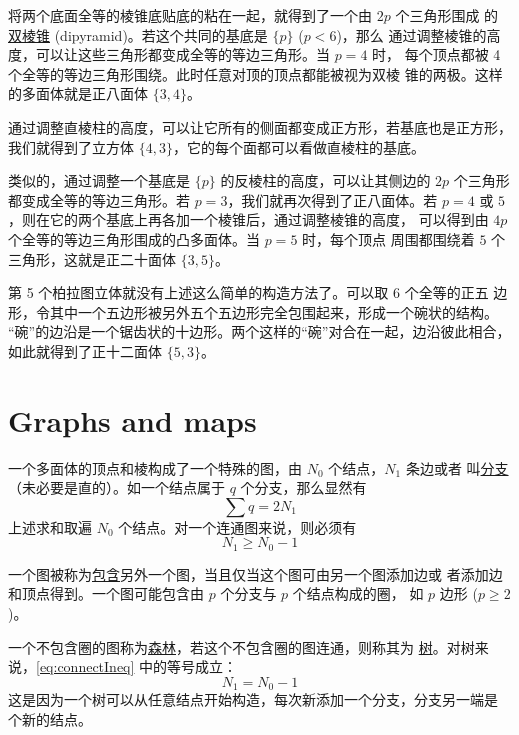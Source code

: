 \documentclass[cs4size,a4paper,adobefonts,openany]{ctexbook}
\newcommand{\pname}[1]{\underline{#1}}
\numberwithin{equation}{section}
\begin{document}
将两个底面全等的棱锥底贴底的粘在一起，就得到了一个由 $2p$ 个三角形围成
的\pname{双棱锥} (dipyramid)。若这个共同的基底是 $\{p\}$ ($p<6$)，那么
通过调整棱锥的高度，可以让这些三角形都变成全等的等边三角形。当 $p=4$ 时，
每个顶点都被 4 个全等的等边三角形围绕。此时任意对顶的顶点都能被视为双棱
锥的两极。这样的多面体就是正八面体 $\{3,4\}$。

通过调整直棱柱的高度，可以让它所有的侧面都变成正方形，若基底也是正方形，
我们就得到了立方体 $\{4,3\}$，它的每个面都可以看做直棱柱的基底。

类似的，通过调整一个基底是 $\{p\}$ 的反棱柱的高度，可以让其侧边的 $2p$
个三角形都变成全等的等边三角形。若 $p=3$，我们就再次得到了正八面体。若
$p=4$ 或 $5$，则在它的两个基底上再各加一个棱锥后，通过调整棱锥的高度，
可以得到由 $4p$ 个全等的等边三角形围成的凸多面体。当 $p=5$ 时，每个顶点
周围都围绕着 $5$ 个三角形，这就是正二十面体 $\{3,5\}$。

第 5 个柏拉图立体就没有上述这么简单的构造方法了。可以取 6 个全等的正五
边形，令其中一个五边形被另外五个五边形完全包围起来，形成一个碗状的结构。
“碗”的边沿是一个锯齿状的十边形。两个这样的“碗”对合在一起，边沿彼此相合，
如此就得到了正十二面体 $\{5,3\}$。

\section{Graphs and maps}
一个多面体的顶点和棱构成了一个特殊的图，由 $N_0$ 个结点，$N_1$ 条边或者
叫\pname{分支}（未必要是直的）。如一个结点属于 $q$ 个分支，那么显然有
\begin{equation}
  \sum q = 2N_1
\end{equation}
上述求和取遍 $N_0$ 个结点。对一个连通图来说，则必须有
\begin{equation}
  \label{eq:connectIneq}
  N_1\geq N_0-1
\end{equation}

一个图被称为\pname{包含}另外一个图，当且仅当这个图可由另一个图添加边或
者添加边和顶点得到。一个图可能包含由 $p$ 个分支与 $p$ 个结点构成的圈，
如 $p$ 边形 ($p\geq 2$)。

一个不包含圈的图称为\pname{森林}，若这个不包含圈的图连通，则称其为
\pname{树}。对树来说，\eqref{eq:connectIneq} 中的等号成立：
\begin{equation}
  N_1=N_0-1
\end{equation}
这是因为一个树可以从任意结点开始构造，每次新添加一个分支，分支另一端是
个新的结点。
\end{document}
